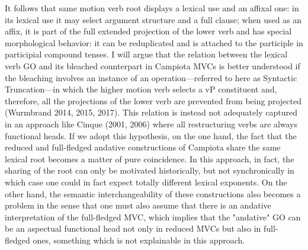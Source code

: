 \documentclass[output=paper,colorlinks,citecolor=brown,
]{langscibook}
\begin{document}
It follows that same motion verb root displays a lexical use and an affixal one:  in its lexical use it may select argument structure and a full clause; when used as an affix, it is part of the full extended projection of the lower verb and has special morphological behavior: it can be reduplicated and is attached to the participle in participial compound tenses.  I will argue that the relation between the lexical verb GO and its bleached counterpart in Campiota MVCs is better understood if the bleaching involves an instance of an operation—referred to here as Syntactic Truncation—in which the higher motion verb selects a vP constituent and, therefore, all the projections of the lower verb are prevented from being projected (Wurmbrand 2014, 2015, 2017). This relation is instead not adequately captured in an approach like Cinque (2001, 2006) where all restructuring verbs are always functional heads. If we adopt this hypothesis, on the one hand, the fact that the reduced and full-fledged andative constructions of  Campiota share the same lexical root becomes a matter of pure coincidence. In this approach, in fact, the sharing of the root can only be motivated historically, but not synchronically in which case one could in fact expect totally different lexical exponents. On the other hand, the semantic interchangeability of these constructions also becomes a problem in the sense that one must also assume that there is an andative interpretation of the full-fledged MVC, which implies that the "andative" GO can be an aspectual functional head not only in reduced MVCs  but also in full-fledged ones, something which is not explainable in this approach.
\end{document}
